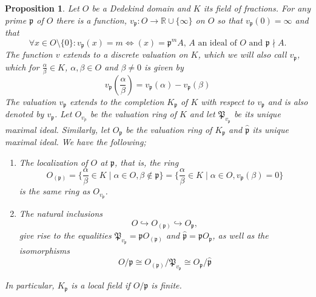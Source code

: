 \documentclass{article}
\newtheorem{proposition}{Proposition}[section]
\newcommand{\mfrak}[1]{\mathfrak{#1}}
\newcommand{\mbb}[1]{\mathbb{#1}}
\newcommand{\vp}{{v_{\mfrak p}}}
\begin{document}
\begin{proposition}
    Let $O$ be a Dedekind domain and $K$ its field of fractions. For any prime $\mfrak p$ of $O$ there is a function, $\vp : O \to \mbb R \cup \{\infty \}$ on $O$ so that $\vp(0) = \infty$ and that
    \begin{equation}\label{eq: valuation}
        \forall x \in O\setminus \{0 \}: \vp(x) = m \iff (x) = \mfrak p^m A \text{, $A$ an ideal of $O$ and $\mfrak p \nmid A$}. 
    \end{equation}
    The function $v$ extends to a discrete valuation on $K$, which we will also call $\vp$, which for $\frac{\alpha}{\beta} \in K$, $\alpha,\beta \in O$ and $\beta \neq 0$ is given by %
    $$v_\mfrak{p}(\frac{\alpha}{\beta}) = v_\mfrak{p}(\alpha) - v_\mfrak{p}(\beta)$$
    The valuation $v_\mfrak{p}$ extends to the completion $K_\mfrak{p}$ of $K$ with respect to $v_\mfrak{p}$ and is also denoted by $v_\mfrak{p}$. Let $O_{v_p}$ be the valuation ring of $K$ and let $\mfrak{P}_{v_\mfrak{p}}$ be its unique maximal ideal. Similarly, let $O_\mfrak{p}$ be the valuation ring of $K_\mfrak{p}$ and $\hat{\mfrak{p}}$ its unique maximal ideal. We have the following;
    
    \begin{enumerate}
        \item The localization of $O$ at $\mfrak p$, that is, the ring 
        $$O_{(\mfrak p)} = \{\frac{\alpha}{\beta} \in K \mid \alpha \in O, \beta \notin \mfrak p\} =  \{\frac{\alpha}{\beta} \in K \mid \alpha \in O, \vp(\beta) = 0 \}$$
        is the same ring as $O_{\vp}$.
        \item The natural inclusions
        $$O \hookrightarrow O_{(\mfrak p)} \hookrightarrow O_\mfrak p,$$
        give rise to the equalities $\mfrak P_\vp = \mfrak p O_{(\mfrak p)}$ and $\hat {\mfrak p }= \mfrak p O_{\mfrak p}$, as well as the isomorphisms
        $$
        O / \mfrak{p} \cong O_{(\mfrak{p})} / \mfrak{P}_{v_{\mfrak{p}}} \cong O_{\mfrak{p}} / \hat{\mfrak{p}}
        $$

    \end{enumerate}
    In particular, $K_\mfrak p$ is a local field if $O / \mfrak{p}$ is finite.
      
    
    
    
\end{proposition}
\end{document}
